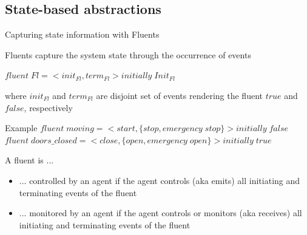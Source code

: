 \documentclass[11pt]{beamer}
\begin{document}
\subsection{State-based abstractions}
\begin{frame}{Capturing state information with Fluents}
	\begin{block}{Fluents capture the system state through the occurrence of events \cite{Milner89}}
		\begin{center}
			$fluent\;Fl = <init_{Fl}, term_{Fl}> initially\;Init_{Fl}$
		\end{center}
		\vspace{-0.4cm}
		where $init_{Fl}$ and $term_{Fl}$ are disjoint set of events rendering the fluent $true$ and $false$, respectively
	\end{block}
	\begin{block}{Example}
		\small
		$fluent\;moving = <start, \{stop, emergency\;stop\}> initially\;false$
		$fluent\;doors\_closed = <close, \{open, emergency\;open\}> initially\;true$
	\end{block}
	\begin{block}{A fluent is ...}
	  	\begin{itemize}
		  	\item ... controlled by an agent if the agent controls (aka emits) all initiating and terminating events of the fluent \cite{Damas06}
			\item ... monitored by an agent if the agent controls or monitors (aka receives) all initiating and terminating events of the fluent
		\end{itemize}
	\end{block}
\end{frame}
\end{document}
